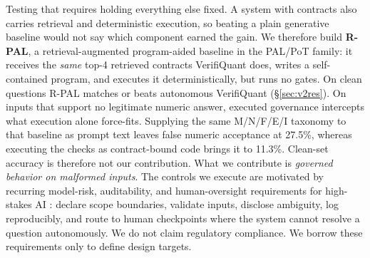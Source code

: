 \documentclass[sigconf,anonymous]{acmart}
\newcommand{\govVQfnar}{11.3\%}           %
\newcommand{\govPromptFnar}{27.5\%}       %
\begin{document}
Testing that requires holding everything else fixed. A system with contracts also carries retrieval and deterministic execution, so beating a plain generative baseline would not say which component earned the gain. We therefore build \textbf{R-PAL}, a retrieval-augmented program-aided baseline in the PAL/PoT family: it receives the \emph{same} top-4 retrieved contracts VerifiQuant does, writes a self-contained program, and executes it deterministically, but runs no gates.
On clean questions R-PAL matches or beats autonomous VerifiQuant (\S\ref{sec:v2res}). On inputs that support no legitimate numeric answer, executed governance intercepts what execution alone force-fits. Supplying the same M/N/F/E/I taxonomy to that baseline as prompt text leaves false numeric acceptance at \govPromptFnar{}, whereas executing the checks as contract-bound code brings it to \govVQfnar{}.
Clean-set accuracy is therefore not our contribution. What we contribute is \emph{governed behavior on malformed inputs}. The controls we execute are motivated by recurring model-risk, auditability, and human-oversight requirements for high-stakes AI \cite{fed2011sr117,euaiact2024,finra2020ai}: declare scope boundaries, validate inputs, disclose ambiguity, log reproducibly, and route to human checkpoints where the system cannot resolve a question autonomously.
We do not claim regulatory compliance. We borrow these requirements only to define design targets.
\end{document}
